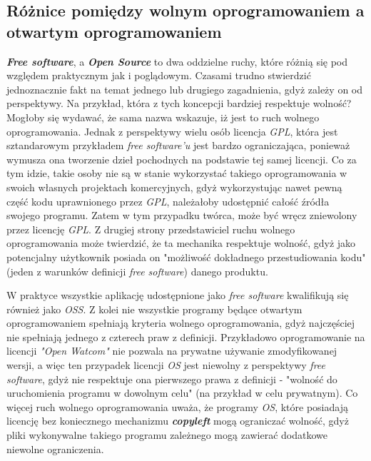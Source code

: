 \documentclass{article}
\begin{document}
\begin{displayquote}
by przeżyć. Ludzie będą mogli oddawać się czynnościom, które sprawiają radość, takim jak programowanie"}\cite{gnu.manifest}. 

\end{displayquote}

\subsection{Różnice pomiędzy wolnym oprogramowaniem a otwartym oprogramowaniem}

\hspace{4mm} \textbf{\emph{Free software}}, a \textbf{\emph{Open Source}} to dwa oddzielne ruchy, które różnią się pod względem praktycznym jak i poglądowym. Czasami trudno stwierdzić jednoznacznie fakt na temat jednego lub drugiego zagadnienia, gdyż zależy on od perspektywy. Na przykład, która z tych koncepcji bardziej respektuje wolność? Mogłoby się wydawać, że sama nazwa wskazuje, iż jest to ruch wolnego oprogramowania. Jednak z perspektywy wielu osób licencja \emph{GPL}, która jest sztandarowym przykładem \emph{free software'u} jest bardzo ograniczająca, ponieważ wymusza ona tworzenie dzieł pochodnych na podstawie tej samej licencji. Co za tym idzie, takie osoby nie są w stanie wykorzystać takiego oprogramowania w swoich własnych projektach komercyjnych, gdyż wykorzystując nawet pewną część kodu uprawnionego przez \emph{GPL}, należałoby udostępnić całość źródła swojego programu. Zatem w tym przypadku twórca, może być wręcz zniewolony przez licencję \emph{GPL}. Z drugiej strony przedstawiciel ruchu wolnego oprogramowania może twierdzić, że ta mechanika respektuje wolność, gdyż jako potencjalny użytkownik posiada on "możliwość dokładnego przestudiowania kodu" (jeden z warunków definicji \emph{free software}) danego produktu.

W praktyce wszystkie aplikację udostępnione jako \emph{free software} kwalifikują się również jako \emph{OSS}. Z kolei nie wszystkie programy będące otwartym oprogramowaniem spełniają kryteria wolnego oprogramowania, gdyż najczęściej nie spełniają jednego z czterech praw z definicji. Przykładowo oprogramowanie na licencji \emph{"Open Watcom"} nie pozwala na prywatne używanie zmodyfikowanej wersji, a więc ten przypadek licencji \emph{OS} jest niewolny z perspektywy \emph{free software}, gdyż nie respektuje ona pierwszego prawa z definicji - "wolność do uruchomienia programu w dowolnym celu" (na przykład w celu prywatnym). Co więcej ruch wolnego oprogramowania uważa, że programy \emph{OS}, które posiadają licencję bez koniecznego mechanizmu \textbf{\emph{copyleft}} mogą ograniczać wolność, gdyż pliki wykonywalne takiego programu zależnego mogą zawierać dodatkowe niewolne ograniczenia\cite{gnu.difference}.
\end{document}
